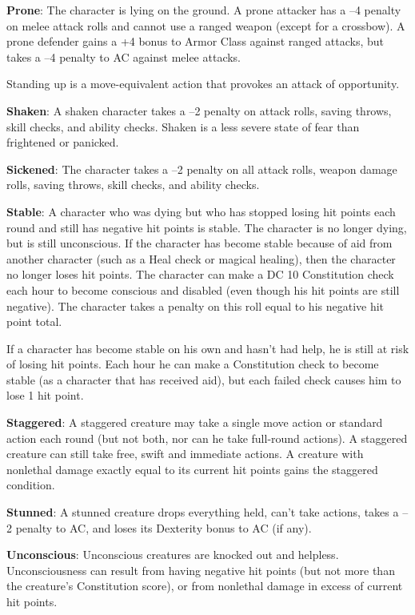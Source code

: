 \textbf{Prone}: The character is lying on the ground. A prone attacker has a --4 penalty on melee attack rolls and cannot use a ranged weapon (except for a crossbow). A prone defender gains a +4 bonus to Armor Class against ranged attacks, but takes a --4 penalty to AC against melee attacks.
				
Standing up is a move-equivalent action that provokes an attack of opportunity.
				
\textbf{Shaken}: A shaken character takes a --2 penalty on attack rolls, saving throws, skill checks, and ability checks. Shaken is a less severe state of fear than frightened or panicked.
				
\textbf{Sickened}: The character takes a --2 penalty on all attack rolls, weapon damage rolls, saving throws, skill checks, and ability checks.
				
\textbf{Stable}: A character who was dying but who has stopped losing hit points each round and still has negative hit points is stable. The character is no longer dying, but is still unconscious. If the character has become stable because of aid from another character (such as a Heal check or magical healing), then the character no longer loses hit points. The character can make a DC 10 Constitution check each hour to become conscious and disabled (even though his hit points are still negative). The character takes a penalty on this roll equal to his negative hit point total. 
				
If a character has become stable on his own and hasn't had help, he is still at risk of losing hit points. Each hour he can make a Constitution check to become stable (as a character that has received aid), but each failed check causes him to lose 1 hit point.
				
\textbf{Staggered}: A staggered creature may take a single move action or standard action each round (but not both, nor can he take full-round actions). A staggered creature can still take free, swift and immediate actions. A creature with nonlethal damage exactly equal to its current hit points gains the staggered condition.
				
\textbf{Stunned}: A stunned creature drops everything held, can't take actions, takes a --2 penalty to AC, and loses its Dexterity bonus to AC (if any).
				
\textbf{Unconscious}: Unconscious creatures are knocked out and helpless. Unconsciousness can result from having negative hit points (but not more than the creature's Constitution score), or from nonlethal damage in excess of current hit points.
